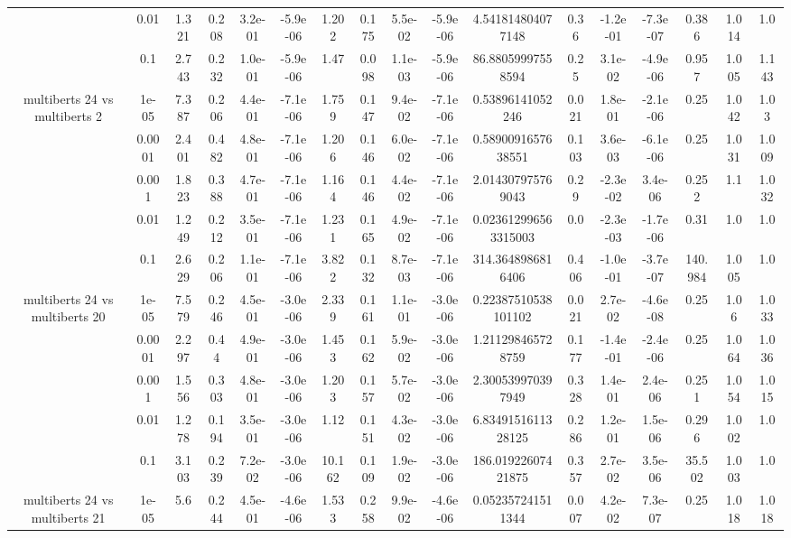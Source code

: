 \begin{tabular}{|c|c|c|c|c|c|c|c|c|c|c|c|c|c|c|c|c|}
 & 0.01 & 1.321 & 0.208 & 3.2e-01 & -5.9e-06 & 1.202 & 0.175 & 5.5e-02 & -5.9e-06 & 4.541814804077148 & 0.36 & -1.2e-01 & -7.3e-07 & 0.386 & 1.014 & 1.0 \\
 & 0.1 & 2.743 & 0.232 & 1.0e-01 & -5.9e-06 & 1.47 & 0.098 & 1.1e-03 & -5.9e-06 & 86.88059997558594 & 0.25 & 3.1e-02 & -4.9e-06 & 0.957 & 1.005 & 1.143 \\
\hline
\multirow{5}{*}{multiberts 24 vs multiberts 2} & 1e-05 & 7.387 & 0.206 & 4.4e-01 & -7.1e-06 & 1.759 & 0.147 & 9.4e-02 & -7.1e-06 & 0.53896141052246 & 0.021 & 1.8e-01 & -2.1e-06 & 0.25 & 1.042 & 1.03 \\
 & 0.0001 & 2.401 & 0.482 & 4.8e-01 & -7.1e-06 & 1.206 & 0.146 & 6.0e-02 & -7.1e-06 & 0.5890091657638551 & 0.103 & 3.6e-03 & -6.1e-06 & 0.25 & 1.031 & 1.009 \\
 & 0.001 & 1.823 & 0.388 & 4.7e-01 & -7.1e-06 & 1.164 & 0.146 & 4.4e-02 & -7.1e-06 & 2.014307975769043 & 0.29 & -2.3e-02 & 3.4e-06 & 0.252 & 1.1 & 1.032 \\
 & 0.01 & 1.249 & 0.212 & 3.5e-01 & -7.1e-06 & 1.231 & 0.165 & 4.9e-02 & -7.1e-06 & 0.023612996563315003 & 0.0 & -2.3e-03 & -1.7e-06 & 0.31 & 1.0 & 1.0 \\
 & 0.1 & 2.629 & 0.206 & 1.1e-01 & -7.1e-06 & 3.822 & 0.132 & 8.7e-03 & -7.1e-06 & 314.3648986816406 & 0.406 & -1.0e-01 & -3.7e-07 & 140.984 & 1.005 & 1.0 \\
\hline
\multirow{5}{*}{multiberts 24 vs multiberts 20} & 1e-05 & 7.579 & 0.246 & 4.5e-01 & -3.0e-06 & 2.339 & 0.161 & 1.1e-01 & -3.0e-06 & 0.22387510538101102 & 0.021 & 2.7e-02 & -4.6e-08 & 0.25 & 1.06 & 1.033 \\
 & 0.0001 & 2.297 & 0.44 & 4.9e-01 & -3.0e-06 & 1.453 & 0.162 & 5.9e-02 & -3.0e-06 & 1.211298465728759 & 0.177 & -1.4e-01 & -2.4e-06 & 0.25 & 1.064 & 1.036 \\
 & 0.001 & 1.556 & 0.303 & 4.8e-01 & -3.0e-06 & 1.203 & 0.157 & 5.7e-02 & -3.0e-06 & 2.300539970397949 & 0.328 & 1.4e-01 & 2.4e-06 & 0.251 & 1.054 & 1.015 \\
 & 0.01 & 1.278 & 0.194 & 3.5e-01 & -3.0e-06 & 1.12 & 0.151 & 4.3e-02 & -3.0e-06 & 6.8349151611328125 & 0.286 & 1.2e-01 & 1.5e-06 & 0.296 & 1.002 & 1.0 \\
 & 0.1 & 3.103 & 0.239 & 7.2e-02 & -3.0e-06 & 10.162 & 0.109 & 1.9e-02 & -3.0e-06 & 186.01922607421875 & 0.357 & 2.7e-02 & 3.5e-06 & 35.502 & 1.003 & 1.0 \\
\hline
\multirow{5}{*}{multiberts 24 vs multiberts 21} & 1e-05 & 5.6 & 0.244 & 4.5e-01 & -4.6e-06 & 1.533 & 0.258 & 9.9e-02 & -4.6e-06 & 0.052357241511344 & 0.007 & 4.2e-02 & 7.3e-07 & 0.25 & 1.018 & 1.018 \\

\end{tabular}
